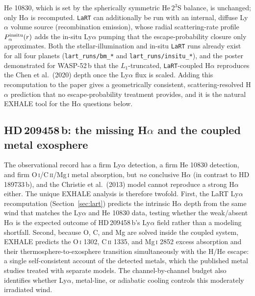 He 10830, which is set by the spherically symmetric He\,$2^3$S balance, is
unchanged; only H$\alpha$ is recomputed. \texttt{LaRT} can additionally be run
with an internal, diffuse Ly$\alpha$ volume source (recombination emission), whose
radial scattering-rate profile $P_\alpha^{\rm insitu}(r)$ adds the in-situ
Ly$\alpha$ pumping that the escape-probability closure only approximates. Both the
stellar-illumination and in-situ \texttt{LaRT} runs already exist for all four
planets (\texttt{lart\_runs/bm\_*} and \texttt{lart\_runs/insitu\_*}), and the
poster demonstrated for WASP-52\,b that the $L_1$-truncated, \texttt{LaRT}-coupled
H$\alpha$ reproduces the Chen et al.\ (2020) depth once the Ly$\alpha$ flux is
scaled. Adding this recomputation to the paper gives a geometrically consistent,
scattering-resolved H$\alpha$ prediction that no escape-probability treatment
provides, and it is the natural EXHALE tool for the H$\alpha$ questions below.

\subsection{HD\,209458\,b: the missing H$\alpha$ and the coupled metal exosphere}
The observational record has a firm Ly$\alpha$ detection, a firm He 10830
detection, and firm O\,\textsc{i}/C\,\textsc{ii}/Mg\,\textsc{i} metal absorption,
but \emph{no} conclusive H$\alpha$ (in contrast to HD\,189733\,b), and the
Christie et al.\ (2013) model cannot reproduce a strong H$\alpha$ either. The
unique EXHALE analysis is therefore twofold. First, the LaRT Ly$\alpha$
recomputation (Section~\ref{sec:lart}) predicts the intrinsic H$\alpha$ depth from
the same wind that matches the Ly$\alpha$ and He 10830 data, testing whether the
weak/absent H$\alpha$ is the expected outcome of HD\,209458\,b's Ly$\alpha$ field
rather than a modeling shortfall. Second, because O, C, and Mg are solved inside
the coupled system, EXHALE predicts the O\,\textsc{i} 1302, C\,\textsc{ii} 1335,
and Mg\,\textsc{i} 2852 excess absorption and their thermosphere-to-exosphere
transition simultaneously with the H/He escape: a single self-consistent
account of the detected metals, which the published metal studies treated with
separate models. The channel-by-channel budget also identifies whether Ly$\alpha$,
metal-line, or adiabatic cooling controls this moderately irradiated wind.

